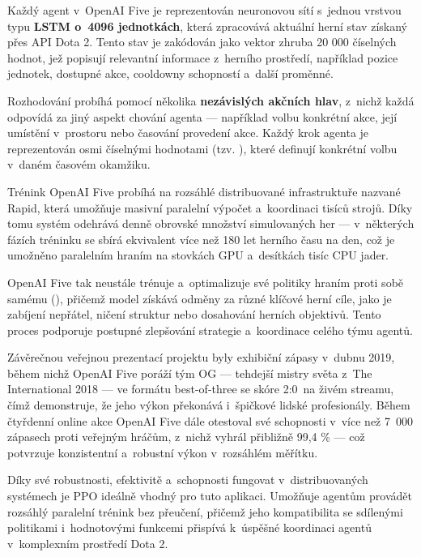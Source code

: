 Každý agent v~OpenAI Five je reprezentován neuronovou sítí s~jednou vrstvou typu \textbf{LSTM o~4096 jednotkách}, která zpracovává aktuální herní stav získaný přes API Dota 2. Tento stav je zakódován jako vektor zhruba 20 000 číselných hodnot, jež popisují relevantní informace z~herního prostředí, například pozice jednotek, dostupné akce, cooldowny schopností a~další proměnné.

Rozhodování probíhá pomocí několika \textbf{nezávislých akčních hlav}, z~nichž každá odpovídá za jiný aspekt chování agenta — například volbu konkrétní akce, její umístění v~prostoru nebo časování provedení akce. Každý krok agenta je reprezentován osmi číselnými hodnotami (tzv. ), které definují konkrétní volbu v~daném časovém okamžiku.

Trénink OpenAI Five probíhá na rozsáhlé distribuované infrastruktuře nazvané Rapid, která umožňuje masivní paralelní výpočet a~koordinaci tisíců strojů. Díky tomu systém odehrává denně obrovské množství simulovaných her — v~některých fázích tréninku se sbírá ekvivalent více než 180 let herního času na den, což je umožněno paralelním hraním  na stovkách GPU a~desítkách tisíc CPU jader.

\newpage

OpenAI Five tak neustále trénuje a~optimalizuje své politiky hraním proti sobě samému (), přičemž model získává odměny za různé klíčové herní cíle, jako je zabíjení nepřátel, ničení struktur nebo dosahování herních objektivů. Tento proces podporuje postupné zlepšování strategie a~koordinace celého týmu agentů.

Závěrečnou veřejnou prezentací projektu byly exhibiční zápasy v~dubnu 2019, během nichž OpenAI Five poráží tým OG — tehdejší mistry světa z~The International 2018 — ve formátu best-of-three se skóre 2:0~na živém streamu, čímž demonstruje, že jeho výkon překonává i~špičkové lidské profesionály. Během čtyřdenní online akce OpenAI Five dále otestoval své schopnosti v~více než 7~000 zápasech proti veřejným hráčům, z~nichž vyhrál přibližně 99{,}4 \% — což potvrzuje konzistentní a~robustní výkon v~rozsáhlém měřítku.

Díky své robustnosti, efektivitě a~schopnosti fungovat v~distribuovaných systémech je PPO ideálně vhodný pro tuto aplikaci. Umožňuje agentům provádět rozsáhlý paralelní trénink bez přeučení, přičemž jeho kompatibilita se sdílenými politikami i~hodnotovými funkcemi přispívá k~úspěšné koordinaci agentů v~komplexním prostředí Dota 2.


